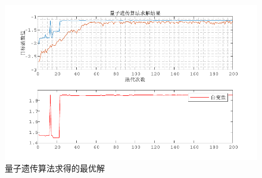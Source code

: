 \documentclass{MathorCupmodeling}
\begin{document}
\begin{figure}[h]
		\centering
		\includegraphics[width=\textwidth]{figure/4.pdf}
		\caption{量子遗传算法求得的最优解}\label{lzycsf}
	\end{figure}












\end{document}
